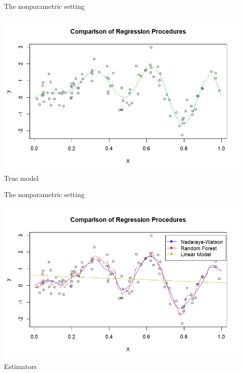 \documentclass{beamer}
\newcommand{\0}{\emptyset}
\newcommand{\1}{\mathmybb{1}}
\begin{document}
\begin{frame}{The nonparametric setting}
  \begin{center}
      \includegraphics[width=0.95\textwidth]{comparison1.png}
      \newline
      \small True model
  \end{center}
\end{frame}
\begin{frame}{The nonparametric setting}
  \begin{center}
      \includegraphics[width=0.95\textwidth]{comparison2.png}
      \newline
      \small Estimators
  \end{center}
\end{frame}
\end{document}
